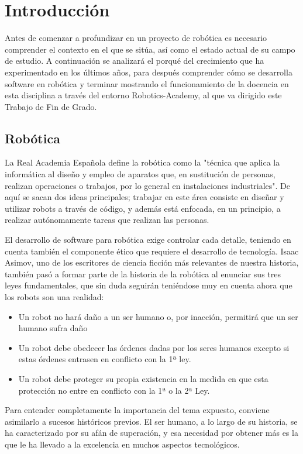 \documentclass[12pt,spanish,chapterprefix, numbers=noenddot]{book}
\numberwithin{equation}{section}
\numberwithin{figure}{section}
\begin{document}
\tableofcontents{}

\mainmatter

\chapter{Introducción}
Antes de comenzar a profundizar en un proyecto de robótica es necesario comprender el contexto en el que se sitúa, así como el estado actual de su campo de estudio. A continuación se analizará el porqué del crecimiento que ha experimentado en los últimos años, para después comprender cómo se desarrolla software en robótica y terminar mostrando el funcionamiento de la docencia en esta disciplina a través del entorno Robotics-Academy, al que va dirigido este Trabajo de Fin de Grado. 

\section{Robótica}
La Real Academia Española define la robótica como la "técnica que aplica la informática al diseño y empleo de aparatos que, en sustitución de personas, realizan operaciones o trabajos, por lo general en instalaciones industriales". De aquí se sacan dos ideas principales; trabajar en este área consiste en diseñar y utilizar robots a través de código, y además está enfocada, en un principio, a realizar autónomamente tareas que realizan las personas.

El desarrollo de software para robótica exige controlar cada detalle, teniendo en cuenta también el componente ético que requiere el desarrollo de tecnología. Isaac Asimov, uno de los escritores de ciencia ficción más relevantes de nuestra historia, también pasó a formar parte de la historia de la robótica al enunciar sus tres leyes fundamentales, que sin duda seguirán teniéndose muy en cuenta ahora que los robots son una realidad:
\begin{itemize}
    \item Un robot no hará daño a un ser humano o, por inacción, permitirá que un ser humano sufra daño
    \item Un robot debe obedecer las órdenes dadas por los seres humanos excepto si estas órdenes entrasen en conflicto con la 1ª ley.
    \item Un robot debe proteger su propia existencia en la medida en que esta protección no entre en conflicto con la 1ª o la 2ª Ley.
\end{itemize}

Para entender completamente la importancia del tema expuesto, conviene asimilarlo a sucesos históricos previos. El ser humano, a lo largo de su historia, se ha caracterizado por su afán de superación, y esa necesidad por obtener más es la que le ha llevado a la excelencia en muchos aspectos tecnológicos. 
\end{document}
